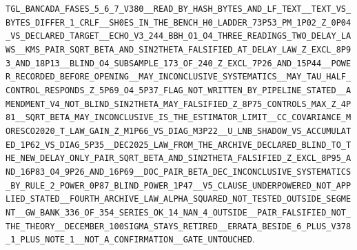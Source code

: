 \documentclass[11pt]{article}
\theoremstyle{definition}\newtheorem{deriv}{Derivação}
\begin{document}
\texttt{TGL\_BANCADA\_FASES\_5\_6\_7\_V380\_\_READ\_BY\_HASH\_BYTES\_AND\_LF\_TEXT\_\_TEXT\_VS\_BYTES\_DIFFER\_1\_CRLF\_\_SH0ES\_IN\_THE\_BENCH\_H0\_LADDER\_73P53\_PM\_1P02\_Z\_0P04\_VS\_DECLARED\_TARGET\_\_ECHO\_V3\_244\_BBH\_O1\_O4\_THREE\_READINGS\_TWO\_DELAY\_LAWS\_\_KMS\_PAIR\_SQRT\_BETA\_AND\_SIN2THETA\_FALSIFIED\_AT\_DELAY\_LAW\_Z\_EXCL\_8P93\_AND\_18P13\_\_BLIND\_O4\_SUBSAMPLE\_173\_OF\_240\_Z\_EXCL\_7P26\_AND\_15P44\_\_POWER\_RECORDED\_BEFORE\_OPENING\_\_MAY\_INCONCLUSIVE\_SYSTEMATICS\_\_MAY\_TAU\_HALF\_CONTROL\_RESPONDS\_Z\_5P69\_O4\_5P37\_FLAG\_NOT\_WRITTEN\_BY\_PIPELINE\_STATED\_\_AMENDMENT\_V4\_NOT\_BLIND\_SIN2THETA\_MAY\_FALSIFIED\_Z\_8P75\_CONTROLS\_MAX\_Z\_4P81\_\_SQRT\_BETA\_MAY\_INCONCLUSIVE\_IS\_THE\_ESTIMATOR\_LIMIT\_\_CC\_COVARIANCE\_MORESCO2020\_T\_LAW\_GAIN\_Z\_M1P66\_VS\_DIAG\_M3P22\_\_U\_LNB\_SHADOW\_VS\_ACCUMULATED\_1P62\_VS\_DIAG\_5P35\_\_DEC2025\_LAW\_FROM\_THE\_ARCHIVE\_DECLARED\_BLIND\_TO\_THE\_NEW\_DELAY\_ONLY\_PAIR\_SQRT\_BETA\_AND\_SIN2THETA\_FALSIFIED\_Z\_EXCL\_8P95\_AND\_16P83\_O4\_9P26\_AND\_16P69\_\_DOC\_PAIR\_BETA\_DEC\_INCONCLUSIVE\_SYSTEMATICS\_BY\_RULE\_2\_POWER\_0P87\_BLIND\_POWER\_1P47\_\_V5\_CLAUSE\_UNDERPOWERED\_NOT\_APPLIED\_STATED\_\_FOURTH\_ARCHIVE\_LAW\_ALPHA\_SQUARED\_NOT\_TESTED\_OUTSIDE\_SEGMENT\_\_GW\_BANK\_336\_OF\_354\_SERIES\_OK\_14\_NAN\_4\_OUTSIDE\_\_PAIR\_FALSIFIED\_NOT\_THE\_THEORY\_\_DECEMBER\_100SIGMA\_STAYS\_RETIRED\_\_ERRATA\_BESIDE\_6\_PLUS\_V378\_1\_PLUS\_NOTE\_1\_\_NOT\_A\_CONFIRMATION\_\_GATE\_UNTOUCHED}.
\end{document}
